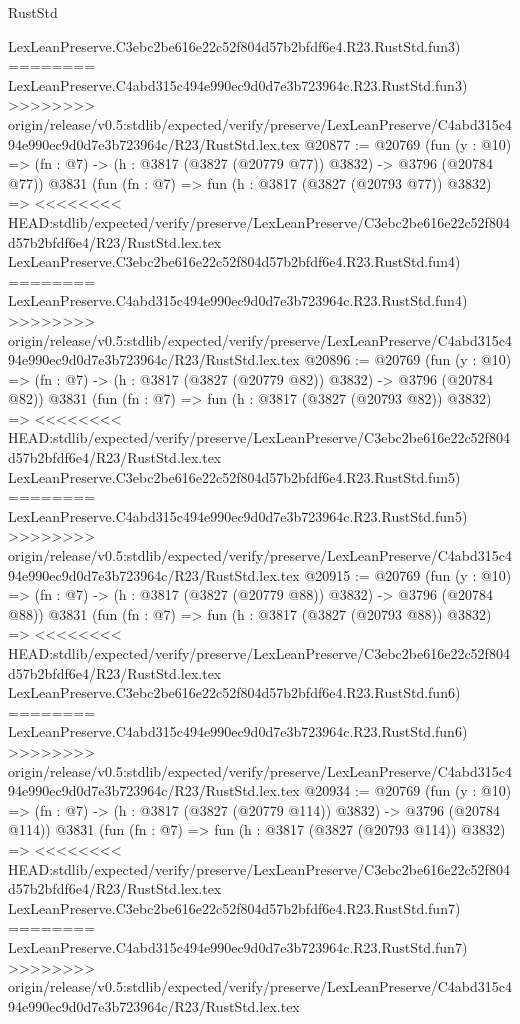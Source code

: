 \begin{lexlean}{RustStd}
\begin{coremodule}
{\begin{coremodule}
{{{{{{{{{{{{{{{{{{{{{{{{{{{{{{{{{{{    LexLeanPreserve.C3ebc2be616e22c52f804d57b2bfdf6e4.R23.RustStd.fun3)
========
    LexLeanPreserve.C4abd315c494e990ec9d0d7e3b723964c.R23.RustStd.fun3)
>>>>>>>> origin/release/v0.5:stdlib/expected/verify/preserve/LexLeanPreserve/C4abd315c494e990ec9d0d7e3b723964c/R23/RustStd.lex.tex
@20877 := @20769
    (fun (y : @10) => (fn : @7) -> (h : @3817 (@3827 (@20779 @77)) @3832) -> @3796 (@20784 @77))
    @3831
    (fun (fn : @7) =>
    fun (h : @3817 (@3827 (@20793 @77)) @3832) =>
<<<<<<<< HEAD:stdlib/expected/verify/preserve/LexLeanPreserve/C3ebc2be616e22c52f804d57b2bfdf6e4/R23/RustStd.lex.tex
    LexLeanPreserve.C3ebc2be616e22c52f804d57b2bfdf6e4.R23.RustStd.fun4)
========
    LexLeanPreserve.C4abd315c494e990ec9d0d7e3b723964c.R23.RustStd.fun4)
>>>>>>>> origin/release/v0.5:stdlib/expected/verify/preserve/LexLeanPreserve/C4abd315c494e990ec9d0d7e3b723964c/R23/RustStd.lex.tex
@20896 := @20769
    (fun (y : @10) => (fn : @7) -> (h : @3817 (@3827 (@20779 @82)) @3832) -> @3796 (@20784 @82))
    @3831
    (fun (fn : @7) =>
    fun (h : @3817 (@3827 (@20793 @82)) @3832) =>
<<<<<<<< HEAD:stdlib/expected/verify/preserve/LexLeanPreserve/C3ebc2be616e22c52f804d57b2bfdf6e4/R23/RustStd.lex.tex
    LexLeanPreserve.C3ebc2be616e22c52f804d57b2bfdf6e4.R23.RustStd.fun5)
========
    LexLeanPreserve.C4abd315c494e990ec9d0d7e3b723964c.R23.RustStd.fun5)
>>>>>>>> origin/release/v0.5:stdlib/expected/verify/preserve/LexLeanPreserve/C4abd315c494e990ec9d0d7e3b723964c/R23/RustStd.lex.tex
@20915 := @20769
    (fun (y : @10) => (fn : @7) -> (h : @3817 (@3827 (@20779 @88)) @3832) -> @3796 (@20784 @88))
    @3831
    (fun (fn : @7) =>
    fun (h : @3817 (@3827 (@20793 @88)) @3832) =>
<<<<<<<< HEAD:stdlib/expected/verify/preserve/LexLeanPreserve/C3ebc2be616e22c52f804d57b2bfdf6e4/R23/RustStd.lex.tex
    LexLeanPreserve.C3ebc2be616e22c52f804d57b2bfdf6e4.R23.RustStd.fun6)
========
    LexLeanPreserve.C4abd315c494e990ec9d0d7e3b723964c.R23.RustStd.fun6)
>>>>>>>> origin/release/v0.5:stdlib/expected/verify/preserve/LexLeanPreserve/C4abd315c494e990ec9d0d7e3b723964c/R23/RustStd.lex.tex
@20934 := @20769
    (fun (y : @10) => (fn : @7) -> (h : @3817 (@3827 (@20779 @114)) @3832) -> @3796 (@20784 @114))
    @3831
    (fun (fn : @7) =>
    fun (h : @3817 (@3827 (@20793 @114)) @3832) =>
<<<<<<<< HEAD:stdlib/expected/verify/preserve/LexLeanPreserve/C3ebc2be616e22c52f804d57b2bfdf6e4/R23/RustStd.lex.tex
    LexLeanPreserve.C3ebc2be616e22c52f804d57b2bfdf6e4.R23.RustStd.fun7)
========
    LexLeanPreserve.C4abd315c494e990ec9d0d7e3b723964c.R23.RustStd.fun7)
>>>>>>>> origin/release/v0.5:stdlib/expected/verify/preserve/LexLeanPreserve/C4abd315c494e990ec9d0d7e3b723964c/R23/RustStd.lex.tex
}}}}}}}}}}}}}}}}}}}}}}}}}}}}}}}}}}}
\end{coremodule}}
\end{coremodule}
\end{lexlean}
